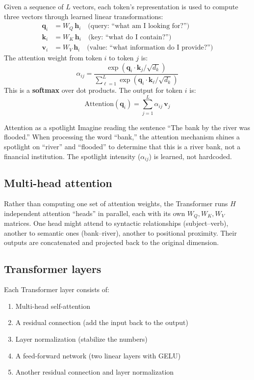 \documentclass[11pt,a4paper]{article}
\theoremstyle{definition}
\begin{document}
\begin{mathbox}
Given a sequence of $L$ vectors, each token's representation is used
to compute three vectors through learned linear transformations:
\begin{align*}
\mathbf{q}_i &= W_Q \, \mathbf{h}_i \quad \text{(query: ``what am I looking for?'')} \\
\mathbf{k}_i &= W_K \, \mathbf{h}_i \quad \text{(key: ``what do I contain?'')} \\
\mathbf{v}_i &= W_V \, \mathbf{h}_i \quad \text{(value: ``what information do I provide?'')}
\end{align*}
The attention weight from token $i$ to token $j$ is:
\[
\alpha_{ij} = \frac{\exp(\mathbf{q}_i \cdot \mathbf{k}_j / \sqrt{d_k})}
                   {\sum_{\ell=1}^{L} \exp(\mathbf{q}_i \cdot \mathbf{k}_\ell / \sqrt{d_k})}
\]
This is a \textbf{softmax} over dot products. The output for token $i$ is:
\[
\text{Attention}(\mathbf{q}_i) = \sum_{j=1}^{L} \alpha_{ij} \, \mathbf{v}_j
\]
\end{mathbox}

\begin{intuition}{Attention as a spotlight}
Imagine reading the sentence ``The bank by the river was flooded.''
When processing the word ``bank,'' the attention mechanism shines a
spotlight on ``river'' and ``flooded'' to determine that this is a
river bank, not a financial institution. The spotlight intensity
($\alpha_{ij}$) is learned, not hardcoded.
\end{intuition}

\subsection{Multi-head attention}

Rather than computing one set of attention weights, the Transformer
runs $H$ independent attention ``heads'' in parallel, each with its
own $W_Q, W_K, W_V$ matrices. One head might attend to syntactic
relationships (subject--verb), another to semantic ones
(bank--river), another to positional proximity. Their outputs are
concatenated and projected back to the original dimension.

\subsection{Transformer layers}

Each Transformer layer consists of:
\begin{enumerate}[nosep]
  \item Multi-head self-attention
  \item A residual connection (add the input back to the output)
  \item Layer normalization (stabilize the numbers)
  \item A feed-forward network (two linear layers with GELU)
  \item Another residual connection and layer normalization
\end{enumerate}
\end{document}
